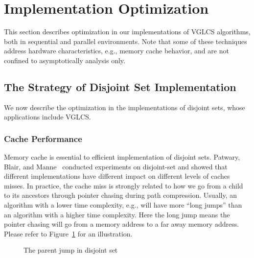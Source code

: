 \section{Implementation Optimization} \label{sec:Implementation}

This section describes optimization in our implementations of VGLCS
algorithms, both in sequential and parallel environments.  Note that
some of these techniques address hardware characteristics, e.g.,
memory cache behavior, and are not confined to asymptotically analysis
only.

\subsection{The Strategy of Disjoint Set Implementation}

We now describe the optimization in the implementations of disjoint
sets, whose applications include VGLCS.


\subsubsection{Cache Performance}

Memory cache is essential to efficient implementation of disjoint sets.
Patwary, Blair, and Manne~\cite{Patwary2010ExperimentsOU} conducted
experiments on disjoint-set and showed that different implementations
have different impact on different levels of caches misses.  In
practice, the cache miss is strongly related to how we go from a child
to its ancestors through pointer chasing during path compression.
Usually, an algorithm with a lower time complexity, e.g., will have more
``long jumps'' than an algorithm with a higher time complexity.  Here
the long jump means the pointer chasing will go from a memory address to
a far away memory address.  Please refer to
Figure~\ref{fig:long-short-jump-disjoint} for an illustration.

\begin{figure}[!thb]
  \centering {} 
  \caption{The parent jump in disjoint set}
  \label{fig:long-short-jump-disjoint}
\end{figure}


